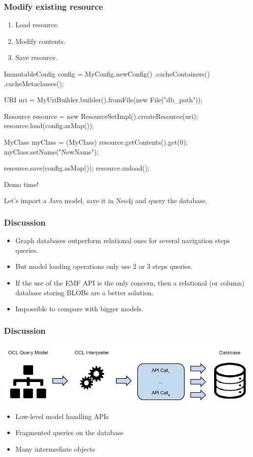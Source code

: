 \documentclass[10pt]{beamer}
\begin{document}
\begin{frame}[fragile]\frametitle{Modify existing resource}
	\begin{enumerate}
		\item Load resource.
		\item Modify contents.
		\item Save resource. 
	\end{enumerate}
	
\begin{java}
ImmutableConfig config = MyConfig.newConfig()
  .cacheContainers()
  .cacheMetaclasses();

URI uri = MyUriBuilder.builder().fromFile(new File("db_path"));

Resource resource = new ResourceSetImpl().createResource(uri);
resource.load(config.asMap());

MyClass myClass = (MyClass) resource.getContents().get(0);
myClass.setName("NewName");

resource.save(config.asMap());
resource.unload();
\end{java}
\end{frame}

\begin{frame}[standout]
  Demo time!

  Let's import a Java model, save it in Neo4j and query the database.
\end{frame}

\begin{frame}[c]\frametitle{Discussion}
	\begin{itemize}
		\item Graph databases outperform relational ones for several navigation steps queries.
		\item But model loading operations only use 2 or 3 steps queries.
		\item If the use of the EMF API is the only concern, then a relational (or column) database storing BLOBs are a better solution.
		\item Impossible to compare with bigger models.
	\end{itemize}
\end{frame}

\begin{frame}[c]\frametitle{Discussion}
    \begin{center}
      \includegraphics[width=\textwidth]{neoemf-discussion.png}
    \end{center}
	\begin{itemize}
		\item Low-level model handling APIs
		\item Fragmented queries on the database
		\item Many intermediate objects
	\end{itemize}
\end{frame}
\end{document}
